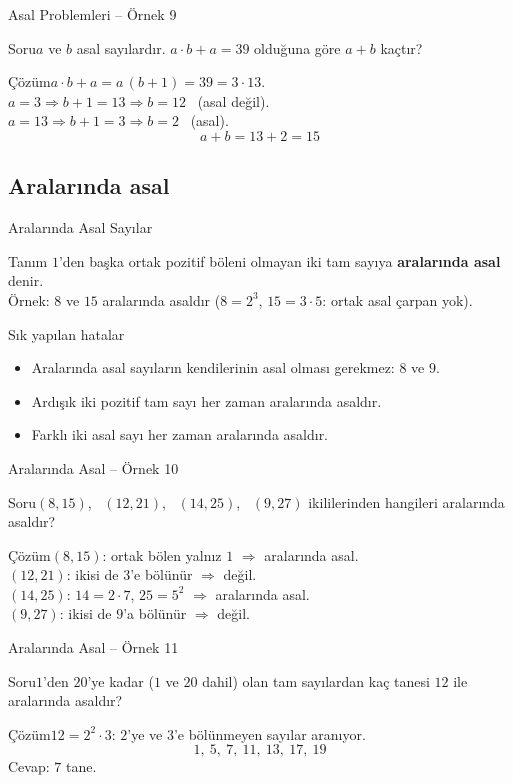 \documentclass[aspectratio=169,11pt]{beamer}
\newcommand{\soru}[3]{%
\begin{frame}{#1}
  \begin{block}{Soru}\large #2\end{block}
  \pause
  \begin{exampleblock}{Çözüm}\large #3\end{exampleblock}
\end{frame}}
\begin{document}
\soru{Asal Problemleri -- Örnek 9}
{\(a\) ve \(b\) asal sayılardır. \(a\cdot b+a=39\) olduğuna göre \(a+b\) kaçtır?}
{\(a\cdot b+a=a\,(b+1)=39=3\cdot 13\).\\[3pt]
\(a=3\Rightarrow b+1=13\Rightarrow b=12\) \ (asal değil).\\
\(a=13\Rightarrow b+1=3\Rightarrow b=2\) \ (asal).
\[a+b=13+2=15\]}

\subsection{Aralarında asal}
\begin{frame}{Aralarında Asal Sayılar}
\begin{block}{Tanım}
\(1\)'den başka ortak pozitif böleni olmayan iki tam sayıya \textbf{aralarında asal} denir.\\
Örnek: \(8\) ve \(15\) aralarında asaldır (\(8=2^3\), \(15=3\cdot 5\): ortak asal çarpan yok).
\end{block}
\begin{alertblock}{Sık yapılan hatalar}
\begin{itemize}
\item Aralarında asal sayıların kendilerinin asal olması gerekmez: \(8\) ve \(9\).
\item Ardışık iki pozitif tam sayı her zaman aralarında asaldır.
\item Farklı iki asal sayı her zaman aralarında asaldır.
\end{itemize}
\end{alertblock}
\end{frame}

\soru{Aralarında Asal -- Örnek 10}
{\((8,15)\), \ \((12,21)\), \ \((14,25)\), \ \((9,27)\) ikililerinden hangileri aralarında asaldır?}
{\((8,15)\): ortak bölen yalnız \(1\) \(\Rightarrow\) aralarında asal.\\
\((12,21)\): ikisi de \(3\)'e bölünür \(\Rightarrow\) değil.\\
\((14,25)\): \(14=2\cdot 7\), \(25=5^2\) \(\Rightarrow\) aralarında asal.\\
\((9,27)\): ikisi de \(9\)'a bölünür \(\Rightarrow\) değil.}

\soru{Aralarında Asal -- Örnek 11}
{\(1\)'den \(20\)'ye kadar (\(1\) ve \(20\) dahil) olan tam sayılardan kaç tanesi \(12\) ile aralarında asaldır?}
{\(12=2^2\cdot 3\): \(2\)'ye ve \(3\)'e bölünmeyen sayılar aranıyor.
\[1,\ 5,\ 7,\ 11,\ 13,\ 17,\ 19\]
Cevap: \(7\) tane.}
\end{document}
